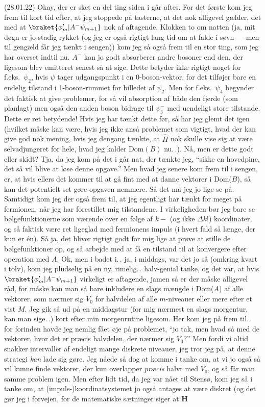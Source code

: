 \documentclass{report}
\begin{document}
(28.01.22) Okay, der er sket en del ting siden i går aftes. For det første kom jeg frem til kort tid efter, at jeg stoppede på tasterne, at det nok alligevel gælder, det med at $\braket{\phi'_{m} | A^- \psi_{m+1}}$ nok af aftagende. Klokken to om natten (ja, mit døgn er jo stadig rykket (og jeg er også rigtigt lang tid om at falde i søvn --- men til gengæld får jeg tænkt i sengen)) kom jeg så også frem til en stor ting, som jeg har overset indtil nu. $A^-$ kan jo godt absorberer andre bosoner end den, der ligesom blev emitteret senest så at sige. Dette betyder ikke rigtigt noget for f.eks.\ $\psi_2$, hvis $\psi$ tager udgangspunkt i en 0-boson-vektor, for det tilføjer bare en endelig tilstand i 1-boson-rummet for billedet af $\psi_2$. Men for f.eks.\ $\psi_4$ begynder det faktisk at give problemer, for så vil absorption af både den fjerde (som planlagt) men også den anden boson bidrage til $\psi_3^-$ med uendeligt store tilstande. Dette er ret betydende! Hvis jeg har tænkt dette før, så har jeg glemt det igen (hvilket måske kan være, hvis jeg ikke anså problemet som vigtigt, hvad der kan give god nok mening, hvis jeg dengang tænkte, at $\hat H$ nok skulle vise sig at være selvadjungeret for hele, hvad jeg kalder Dom$(B)$ nu.\,.). Nå, men er dette godt eller skidt? Tja, da jeg kom på det i går nat, der tænkte jeg, ``sikke en hovedpine, det så vil blive at løse denne opgave.'' Men hvad jeg senere kom frem til i sengen, er, at hvis ellers det kommer til at gå fint med at danne vektorer i Dom($B$), så kan det potentielt set gøre opgaven nemmere. Så det må jeg jo lige se på. Samtidigt kom jeg der også frem til, at jeg egentligt har tænkt for meget på fermionen, når jeg har forestillet mig tilstandene. I virkeligheden bør jeg bare se bølgefunktionerne som værende over en følge af $k-$ (og ikke $\Delta k$!) koordinater, og så faktisk være ret ligeglad med fermionens impuls (i hvert fald så længe, der kun er én). Så ja, det bliver rigtigt godt for mig lige at prøve at stille de bølgefunktioner op, og så arbejde med at få en tilstand til at konvergere efter operation med $A$. Ok, men i badet i.\,. ja, i middags, var det jo så (omkring kvart i tolv), kom jeg pludselig på en ny, rimelig.\,. halv-genial tanke, og det var, at hvis $\braket{\phi'_{m} | A^- \psi_{m+1}}$ virkeligt er aftagende, jamen så er der måske alligevel råd, for måske kan man så bare inkludere en slags mængde i Dom($A$) af alle vektorer, som nærmer sig $V_0$ for halvdelen af alle $m$-niveauer eller mere efter et vist $M$. Jeg gik så ud på en middagstur (for mig nærmest en slags morgentur, kan man sige.\,.) kort efter min morgenrutine ligesom. Her kom jeg på frem til.\,. for forinden havde jeg nemlig fået øje på problemet, ``jo tak, men hvad så med de vektorer, hvor det er præcis halvdelen, der nærmer sig $V_0$?'' Men fordi vi altid snakker intervaller af endeligt mange diskrete niveauer, jeg tror jeg på, at denne strategi \emph{kan} lade sig gøre. Jeg nåede så dog at komme i tanke om, at vi jo også så vil kunne finde vektorer, der kun overlapper \emph{præcis} halvt med $V_0$, og så får man samme problem igen. Men efter lidt tid, da jeg var nået til Stensø, kom jeg så i tanke om, at (impuls-)koordinatsystemet jo også antages at være diskret (og det gør jeg i forvejen, for de matematiske sætninger siger at \textbf{H} 
\end{document}
